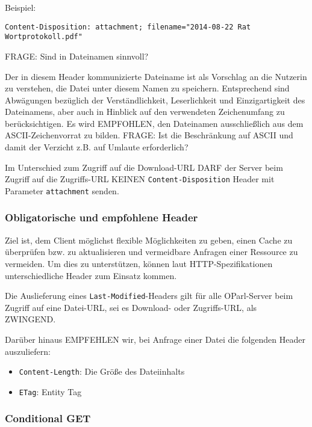 \documentclass[,a4paper]{article}
\begin{document}
Beispiel:

\begin{verbatim}
Content-Disposition: attachment; filename="2014-08-22 Rat Wortprotokoll.pdf"
\end{verbatim}

FRAGE: Sind in Dateinamen sinnvoll?

Der in diesem Header kommunizierte Dateiname ist als Vorschlag an die
Nutzerin zu verstehen, die Datei unter diesem Namen zu speichern.
Entsprechend sind Abwägungen bezüglich der Verständlichkeit,
Leserlichkeit und Einzigartigkeit des Dateinamens, aber auch in Hinblick
auf den verwendeten Zeichenumfang zu berücksichtigen. Es wird EMPFOHLEN,
den Dateinamen ausschließlich aus dem ASCII-Zeichenvorrat zu bilden.
FRAGE: Ist die Beschränkung auf ASCII und damit der Verzicht z.B. auf
Umlaute erforderlich?

Im Unterschied zum Zugriff auf die Download-URL DARF der Server beim
Zugriff auf die Zugriffs-URL KEINEN \texttt{Content-Disposition} Header
mit Parameter \texttt{attachment} senden.

\subsubsection{Obligatorische und empfohlene
Header}\label{obligatorische-und-empfohlene-header}

Ziel ist, dem Client möglichst flexible Möglichkeiten zu geben, einen
Cache zu überprüfen bzw. zu aktualisieren und vermeidbare Anfragen einer
Ressource zu vermeiden. Um dies zu unterstützen, können laut
HTTP-Spezifikationen unterschiedliche Header zum Einsatz kommen.

Die Auslieferung eines \texttt{Last-Modified}-Headers gilt für alle
OParl-Server beim Zugriff auf eine Datei-URL, sei es Download- oder
Zugriffs-URL, als ZWINGEND.

Darüber hinaus EMPFEHLEN wir, bei Anfrage einer Datei die folgenden
Header auszuliefern:

\begin{itemize}
\itemsep1pt\parskip0pt
\item
  \texttt{Content-Length}: Die Größe des Dateiinhalts
\item
  \texttt{ETag}: Entity Tag
\end{itemize}

\subsubsection{Conditional GET}\label{conditional-get}
\end{document}
